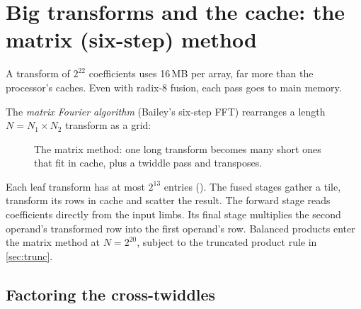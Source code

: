 \section{Big transforms and the cache: the matrix (six-step) method}
\label{sec:mfa}

A transform of $2^{22}$ coefficients uses 16\,MB per array, far more than the processor's
caches. Even with radix-8 fusion, each pass goes to main memory.

The \emph{matrix Fourier algorithm} (Bailey's six-step FFT) rearranges a length
$N = N_1 \times N_2$ transform as a grid:

\begin{figure}[ht]
\centering
{}
\caption{The matrix method: one long transform becomes many short ones that fit in cache,
plus a twiddle pass and transposes.}
\end{figure}

Each leaf transform has at most $2^{13}$ entries ().
The fused stages gather a tile, transform its rows in cache and scatter the result.
The forward stage reads coefficients directly from the input limbs. Its final stage
multiplies the second operand's transformed row into the first operand's row.
Balanced products enter the matrix method at $N=2^{20}$, subject to the truncated
product rule in \cref{sec:trunc}.

\subsection{Factoring the cross-twiddles}

